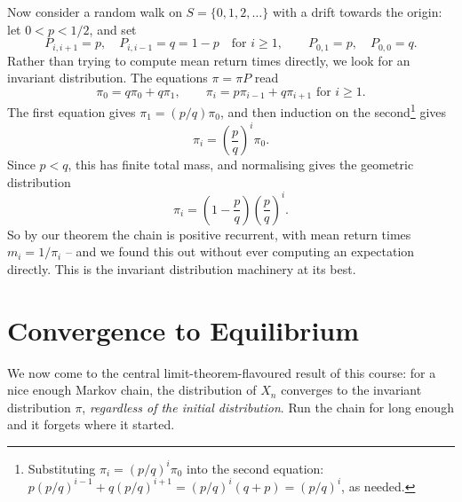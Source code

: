 \begin{example}
	Now consider a random walk on $S = \{0, 1, 2, \dots\}$ with a drift towards the origin: let $0 < p < 1/2$, and set
	$$
	P_{i, i + 1} = p, \quad P_{i, i - 1} = q = 1 - p \quad \text{for } i \geq 1, \qquad P_{0, 1} = p, \quad P_{0, 0} = q.
	$$
	Rather than trying to compute mean return times directly, we look for an invariant distribution. The equations $\pi = \pi P$ read
	$$
	\pi_0 = q\pi_0 + q \pi_1, \qquad \pi_i = p\pi_{i - 1} + q\pi_{i + 1} \text{ for } i \geq 1.
	$$
	The first equation gives $\pi_1 = (p/q)\pi_0$, and then induction on the second\footnote{Substituting $\pi_i = (p/q)^i \pi_0$ into the second equation: $p (p/q)^{i-1} + q(p/q)^{i + 1} = (p/q)^i (q + p) = (p/q)^i$, as needed.} gives
	$$
	\pi_i = \left(\frac{p}{q}\right)^i \pi_0.
	$$
	Since $p < q$, this has finite total mass, and normalising gives the geometric distribution
	$$
	\pi_i = \left(1 - \frac{p}{q}\right)\left(\frac{p}{q}\right)^i.
	$$
	So by our theorem the chain is positive recurrent, with mean return times $m_i = 1/\pi_i$ -- and we found this out without ever computing an expectation directly. This is the invariant distribution machinery at its best.
\end{example}

\section{Convergence to Equilibrium}

We now come to the central limit-theorem-flavoured result of this course: for a nice enough Markov chain, the distribution of $X_n$ converges to the invariant distribution $\pi$, \emph{regardless of the initial distribution}. Run the chain for long enough and it forgets where it started.


